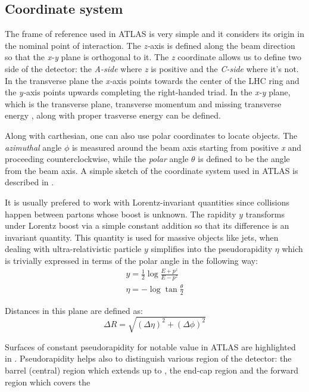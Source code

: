 \subsection{Coordinate system}
The frame of reference used in ATLAS is very simple and it considers its origin in the nominal point of interaction. The \emph{z-}axis is defined along the beam direction so that the \emph{x-y} plane is orthogonal to it. The \emph{z} coordinate allows us to define two side of the detector: the \emph{A-side} where \emph{z} is positive and the \emph{C-side} where it's not. In the transverse plane the \emph{x-}axis points towards the center of the LHC ring and the \emph{y-}axis points upwards completing the right-handed triad. In the \emph{x-y} plane, which is the transverse plane, transverse momentum \pt and missing transverse energy \met, along with proper trasverse energy \et can be defined.

Along with carthesian, one can also use polar coordinates to locate objects. The \emph{azimuthal} angle $\phi$ is measured around the beam axis starting from positive \emph{x} and proceeding counterclockwise, while the \emph{polar} angle $\theta$ is defined to be the angle from the beam axis. A simple sketch of the coordinate system used in ATLAS is described in \Fig{\ref{fig:coordinate}}.

It is usually prefered to work with Lorentz-invariant quantities since collisions happen between partons whose boost is unknown. The rapidity $y$ transforms under Lorentz boost via a simple constant addition so that its difference is an invariant quantity. This quantity is used for massive objects like jets, when dealing with ultra-relativistic particle $y$ simplifies into the pseudorapidity $\eta$ which is trivially expressed in terms of the polar angle in the following way:
\begin{gather}
	y=\frac{1}{2}\log{\frac{E+p^z}{E-p^z}}\\
	\eta=-\log{\tan{\frac{\theta}{2}}}
\end{gather}

Distances in this plane are defined as:
\begin{equation}
	\Delta R=\sqrt{\left(\Delta \eta \right)^2 + \left(\Delta \phi \right)^2}
\end{equation}

Surfaces of constant pseudorapidity for notable value in ATLAS are highlighted in \Fig{\ref{fig:pseudorapidita}}. Pseudorapidity helps also to distinguish various region of the detector: the barrel (central) region which extends up to , the  end-cap region  and the forward region which covers the 


